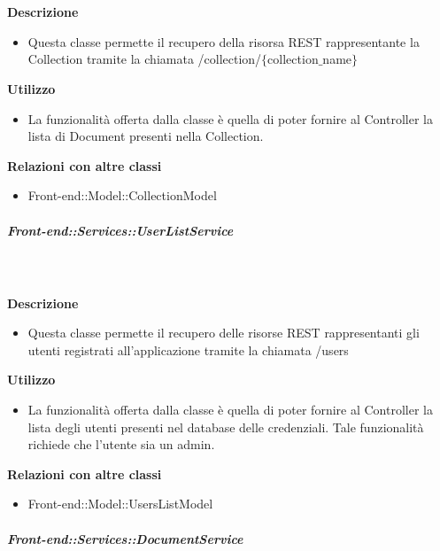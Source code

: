         \textbf{\\ \\ Descrizione} 
          \begin{itemize}
            \item[] Questa classe permette il recupero della risorsa REST rappresentante la Collection tramite la chiamata  /collection/$\{$collection$\_$name$\}$
          \end{itemize}      
        \textbf{Utilizzo}  
          \begin{itemize}
            \item[] La  funzionalità offerta dalla classe è quella di poter fornire al Controller la lista di Document presenti nella Collection.
          \end{itemize}
          \textbf{Relazioni con altre classi}
          \begin{itemize}
              \item{Front-end::Model::CollectionModel}
          \end{itemize}
      \subparagraph{Front-end::Services::UserListService}
        
        \textbf{\\ \\ Descrizione} 
          \begin{itemize}
            \item[] Questa classe permette il recupero delle risorse REST rappresentanti gli utenti registrati all'applicazione tramite la chiamata /users
          \end{itemize}      
        \textbf{Utilizzo}  
          \begin{itemize}
            \item[] La funzionalità offerta dalla classe è quella di poter fornire al Controller la lista degli utenti presenti nel database delle credenziali.
Tale funzionalità richiede che l'utente sia un admin.
          \end{itemize}
          \textbf{Relazioni con altre classi}
          \begin{itemize}
              \item{Front-end::Model::UsersListModel}
          \end{itemize}
      \subparagraph{Front-end::Services::DocumentService}
        
